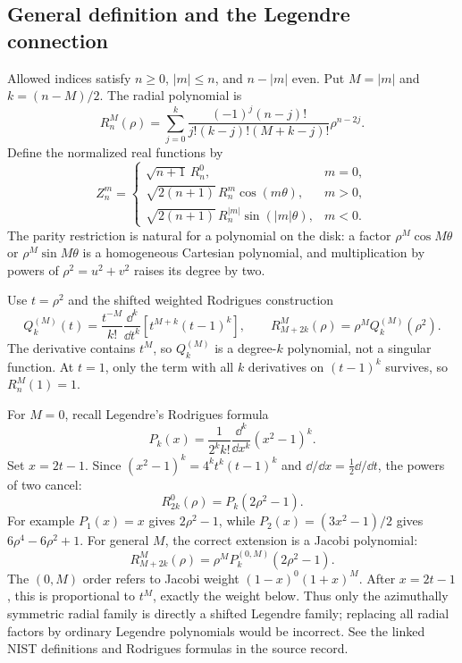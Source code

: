 \subsection{General definition and the Legendre connection}
Allowed indices satisfy $n\geq0$, $|m|\leq n$, and $n-|m|$ even. Put $M=|m|$ and $k=(n-M)/2$. The radial polynomial is
\begin{equation}
\boxed{R_n^M(\rho)=\sum_{j=0}^{k}
\frac{(-1)^j(n-j)!}{j!(k-j)!(M+k-j)!}\rho^{n-2j}.}
\label{eq:radial}
\end{equation}
Define the normalized real functions by
\begin{equation}
\boxed{Z_n^m=\begin{cases}
\sqrt{n+1}\,R_n^0,&m=0,\\
\sqrt{2(n+1)}\,R_n^m\cos(m\theta),&m>0,\\
\sqrt{2(n+1)}\,R_n^{|m|}\sin(|m|\theta),&m<0.
\end{cases}}
\label{eq:zdef}
\end{equation}
The parity restriction is natural for a polynomial on the disk: a factor $\rho^M\cos M\theta$ or $\rho^M\sin M\theta$ is a homogeneous Cartesian polynomial, and multiplication by powers of $\rho^2=u^2+v^2$ raises its degree by two.

Use $t=\rho^2$ and the shifted weighted Rodrigues construction
\begin{equation}
Q_k^{(M)}(t)=\frac{t^{-M}}{k!}\frac{\dd^k}{\dd t^k}
\left[t^{M+k}(t-1)^k\right],\qquad
R_{M+2k}^M(\rho)=\rho^M Q_k^{(M)}(\rho^2).
\label{eq:rodrigues}
\end{equation}
The derivative contains $t^M$, so $Q_k^{(M)}$ is a degree-$k$ polynomial, not a singular function. At $t=1$, only the term with all $k$ derivatives on $(t-1)^k$ survives, so $R_n^M(1)=1$.

For $M=0$, recall Legendre's Rodrigues formula
\begin{equation}
P_k(x)=\frac{1}{2^k k!}\frac{\dd^k}{\dd x^k}(x^2-1)^k.
\end{equation}
Set $x=2t-1$. Since $(x^2-1)^k=4^kt^k(t-1)^k$ and $\dd/\dd x=\tfrac12\dd/\dd t$, the powers of two cancel:
\begin{equation}
\boxed{R_{2k}^{0}(\rho)=P_k(2\rho^2-1).}
\end{equation}
For example $P_1(x)=x$ gives $2\rho^2-1$, while
$P_2(x)=(3x^2-1)/2$ gives $6\rho^4-6\rho^2+1$.
For general $M$, the correct extension is a Jacobi polynomial:
\begin{equation}
\boxed{R_{M+2k}^{M}(\rho)=\rho^M P_k^{(0,M)}(2\rho^2-1).}
\label{eq:jacobi}
\end{equation}
The $(0,M)$ order refers to Jacobi weight $(1-x)^0(1+x)^M$. After $x=2t-1$, this is proportional to $t^M$, exactly the weight below. Thus only the azimuthally symmetric radial family is directly a shifted Legendre family; replacing all radial factors by ordinary Legendre polynomials would be incorrect. See the linked NIST definitions and Rodrigues formulas in the source record.

